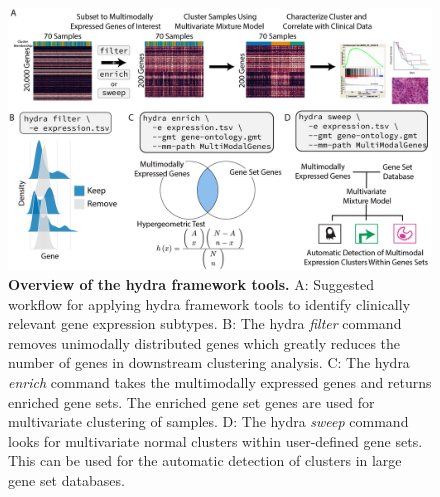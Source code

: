 \documentclass[10pt,letterpaper]{article}
\begin{document}
\begin{figure}[h!]
	\includegraphics[width=\textwidth]{"img/PNG/overview-fig"}
	\caption{{\bf Overview of the hydra framework tools.}
		A: Suggested workflow for applying hydra framework tools to identify clinically relevant gene expression subtypes. B: The hydra \textit{filter} command removes unimodally distributed genes which greatly reduces the number of genes in downstream clustering analysis. C: The hydra \textit{enrich} command takes the multimodally expressed genes and returns enriched gene sets. The enriched gene set genes are used for multivariate clustering of samples. D: The hydra 
	    \textit{sweep} command looks for multivariate normal clusters within user-defined gene sets. This can be used for the automatic detection of clusters in large gene set databases.
		\label{overview}}
\end{figure}
\end{document}
